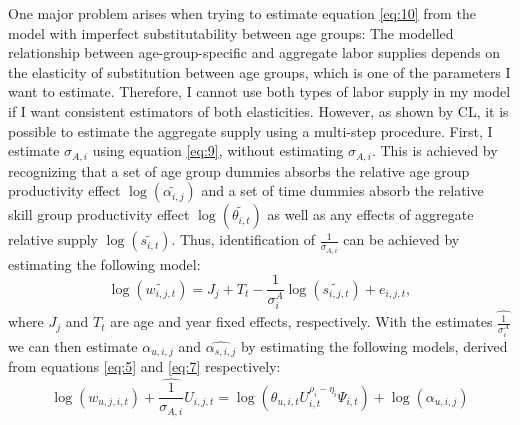 \documentclass[]{article}
\begin{document}
One major problem arises when trying to estimate equation
\eqref{eq:10} from the model with imperfect substitutability between
age groups: The modelled relationship between age-group-specific and
aggregate labor supplies depends on the elasticity of substitution
between age groups, which is one of the parameters I want to
estimate. Therefore, I cannot use both types of labor supply in my
model if I want consistent estimators of both elasticities. However,
as shown by CL, it is possible to estimate the aggregate supply using
a multi-step procedure. First, I estimate $\sigma_{A,i}$ using
equation \eqref{eq:9}, without estimating $\sigma_{A,i}$. This is
achieved by recognizing that a set of age group dummies absorbs the
relative age group productivity effect
$ \log \left( \widetilde{\alpha_{i,j}} \right)$ and a set of time
dummies absorb the relative skill group productivity effect
$ \log \left( \widetilde{\theta_{i,t}} \right)$ as well as any effects
of aggregate relative supply
$\log \left( \widetilde{s_{i,t}} \right)$. Thus, identification of
$\frac{1}{\sigma_{A,i}}$ can be achieved by estimating the following
model:
\begin{equation}
  \label{eq:11}
  \log \left( \widetilde{w_{i,j,t}} \right) = J_{j} +
  T_{t} - \frac{1}{\sigma^{A}_{i}}\log\left(
    \widetilde{s_{i,j,t}} \right) + e_{i,j,t},
\end{equation}
where $J_{j}$ and $T_{t}$ are age and year fixed effects,
respectively. With the estimates $\widehat{\frac{1}{\sigma_{i}^{A}}}$
we can then estimate $\widehat{\alpha_{u,i,j}}$ and
$\widehat{\alpha_{s,i,j}}$ by estimating the following models, derived
from equations \eqref{eq:5} and \eqref{eq:7} respectively:
\begin{equation}
  \label{eq:12}
  \log (w_{u,j,i,t}) + \widehat{\frac{1}{\sigma_{A,i}}}U_{i,j,t} = \log
  \left( \theta_{u,i,t}U_{i,t}^{\rho_{i}-\eta_{i}}\Psi_{i,t} \right) + \log(\alpha_{u,i,j})
\end{equation}
\end{document}
